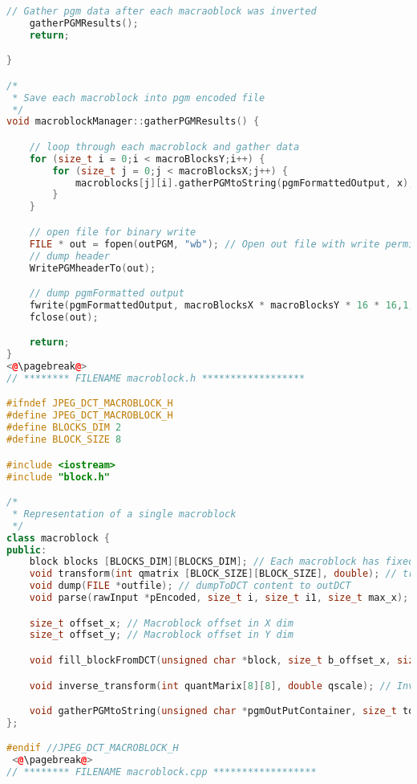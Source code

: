 \documentclass{report}
\begin{document}
\begin{lstlisting}[language=C++]
    // Gather pgm data after each macraoblock was inverted
    gatherPGMResults();
    return;

}

/*
 * Save each macroblock into pgm encoded file
 */
void macroblockManager::gatherPGMResults() {

    // loop through each macroblock and gather data
    for (size_t i = 0;i < macroBlocksY;i++) {
        for (size_t j = 0;j < macroBlocksX;j++) {
            macroblocks[j][i].gatherPGMtoString(pgmFormattedOutput, x);
        }
    }

    // open file for binary write
    FILE * out = fopen(outPGM, "wb"); // Open out file with write permissions (file will be overwritten)
    // dump header
    WritePGMheaderTo(out);

    // dump pgmFormatted output
    fwrite(pgmFormattedOutput, macroBlocksX * macroBlocksY * 16 * 16,1,out);
    fclose(out);

    return;
}
<@\pagebreak@>
// ******** FILENAME macroblock.h ******************

#ifndef JPEG_DCT_MACROBLOCK_H
#define JPEG_DCT_MACROBLOCK_H
#define BLOCKS_DIM 2
#define BLOCK_SIZE 8

#include <iostream>
#include "block.h"

/*
 * Representation of a single macroblock
 */
class macroblock {
public:
    block blocks [BLOCKS_DIM][BLOCKS_DIM]; // Each macroblock has fixed number of blocks
    void transform(int qmatrix [BLOCK_SIZE][BLOCK_SIZE], double); // transoform will apply rawInput, quantmatrix, and zigzag
    void dump(FILE *outfile); // dumpToDCT content to outDCT
    void parse(rawInput *pEncoded, size_t i, size_t i1, size_t max_x); // Parse corresponding pgm encoded string

    size_t offset_x; // Macroblock offset in X dim
    size_t offset_y; // Macroblock offset in Y dim

    void fill_blockFromDCT(unsigned char *block, size_t b_offset_x, size_t b_offset_y); // Fill on of the block from DCT encoded string

    void inverse_transform(int quantMarix[8][8], double qscale); // Inverse transform each block in this macroblock

    void gatherPGMtoString(unsigned char *pgmOutPutContainer, size_t totalX); // Gather pgm Encoded string from each block
};

#endif //JPEG_DCT_MACROBLOCK_H
 <@\pagebreak@>
// ******** FILENAME macroblock.cpp ******************


\end{lstlisting}
\end{document}
